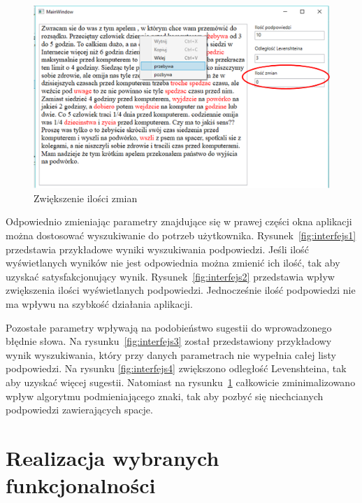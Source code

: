 \begin{figure} [H]
	\centering
	\includegraphics[width=1\linewidth]{rozdzial03/screen6_1.png}
	\caption{Zwiększenie ilości zmian}
	\label{fig:interfejs5}
\end{figure}

Odpowiednio zmieniając parametry znajdujące się w prawej części okna aplikacji można dostosować wyszukiwanie do potrzeb użytkownika. Rysunek~\ref{fig:interfejs1} przedstawia przykładowe wyniki wyszukiwania podpowiedzi. Jeśli ilość wyświetlanych wyników nie jest odpowiednia można zmienić ich ilość, tak aby uzyskać satysfakcjonujący wynik. Rysunek~\ref{fig:interfejs2} przedstawia wpływ zwiększenia ilości wyświetlanych podpowiedzi. Jednocześnie ilość podpowiedzi nie ma wpływu na szybkość działania aplikacji. 

Pozostałe parametry wpływają na podobieństwo sugestii do wprowadzonego błędnie słowa. Na rysunku~\ref{fig:interfejs3} został przedstawiony przykładowy wynik wyszukiwania, który przy danych parametrach nie wypełnia całej listy podpowiedzi. Na rysunku \ref{fig:interfejs4} zwiększono odległość Levenshteina, tak aby uzyskać więcej sugestii. Natomiast na rysunku~\ref{fig:interfejs5} całkowicie zminimalizowano wpływ algorytmu podmieniającego znaki, tak aby pozbyć się niechcianych podpowiedzi zawierających spacje.
 
\section{Realizacja wybranych funkcjonalności}

